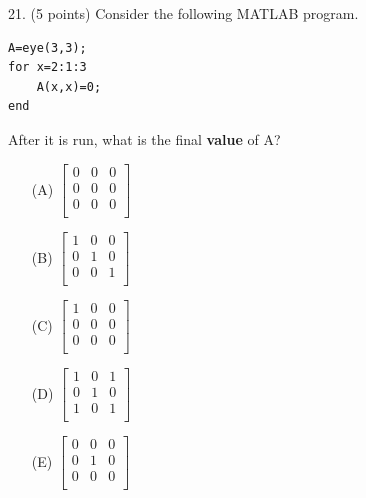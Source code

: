 \documentclass{article}
\begin{document}
\noindent
\begin{minipage}{\textwidth}
21. (5 points)
Consider the following MATLAB program.
\begin{verbatim}
A=eye(3,3);
for x=2:1:3
    A(x,x)=0;
end
\end{verbatim}
After it is run, what is the final \textbf{value} of A?

\begin{enumerate}
\item[(A)]
$ \left[ \begin{array}{ccc} 0 & 0 & 0 \\ 0 & 0 & 0 \\ 0 & 0 & 0 \\ \end{array} \right] $

\item[(B)]
$ \left[ \begin{array}{ccc} 1 & 0 & 0 \\ 0 & 1 & 0 \\ 0 & 0 & 1 \\ \end{array} \right] $

\item[(C)]
$ \left[ \begin{array}{ccc} 1 & 0 & 0 \\ 0 & 0 & 0 \\ 0 & 0 & 0 \\ \end{array} \right] $

\item[(D)]
$ \left[ \begin{array}{ccc} 1 & 0 & 1 \\ 0 & 1 & 0 \\ 1 & 0 & 1 \\ \end{array} \right] $

\item[(E)]
$ \left[ \begin{array}{ccc} 0 & 0 & 0 \\ 0 & 1 & 0 \\ 0 & 0 & 0 \\ \end{array} \right] $

\end{enumerate}
\end{minipage}
\vspace{10em}
\filbreak\vfil{}\vfilneg
\end{document}
